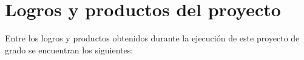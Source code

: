 \chapter{Logros y productos del proyecto} %

\label{chap:achievements} %


Entre los logros y productos obtenidos durante la ejecución de este proyecto de grado se encuentran los siguientes: 

